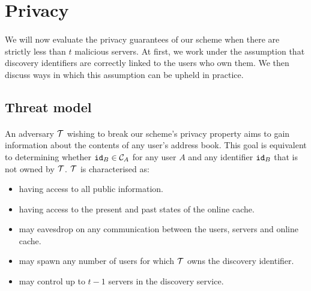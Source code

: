 		


\section{Privacy}
\label{sec:security}


\paragraph{} We will now evaluate the privacy guarantees of our scheme when there are strictly less than $t$ malicious servers. At first, we work under the assumption that discovery identifiers are correctly linked to the users who own them. We then discuss ways in which this assumption can be upheld in practice.





	\subsection{Threat model}
	\paragraph{} An adversary $\mathcal{T}$ wishing to break our scheme's privacy property aims to gain information about the contents of any user's address book. This goal is equivalent to determining whether $\mathtt{id}_B \in \mathcal{C}_{A}$ for any user $A$ and any identifier $\mathtt{id}_B$ that is not owned by $\mathcal{T}$. $\mathcal{T}$ is characterised as:
	\begin{itemize}
		\item having access to all public information.
		\item having access to the present and past states of the online cache.
		\item may eavesdrop on any communication between the users, servers and online cache.
		\item may spawn any number of users for which $\mathcal{T}$ owns the discovery identifier.
		\item may control up to $t-1$ servers in the discovery service.
	\end{itemize}
	
